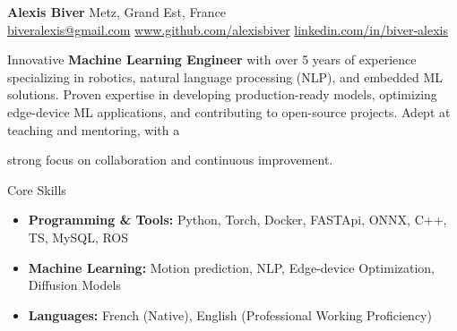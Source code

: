 \documentclass{resume} %
\begin{document}
\begin{center}
    {\Huge \textbf{Alexis Biver}} \hspace{5cm} Metz, Grand Est, France \\
    \href{mailto:biveralexis@gmail.com}{biveralexis@gmail.com}   \hspace{1cm}     \href{https://github.com/alexisbiver}{www.github.com/alexisbiver}  \hspace{1cm} \href{https://linkedin.com/in/biver-alexis}{linkedin.com/in/biver-alexis}
\end{center}

\vspace{0.3cm}

Innovative \textbf{Machine Learning Engineer} with over 5 years of experience specializing in robotics, natural language processing (NLP), and embedded ML solutions. Proven expertise in developing production-ready models, optimizing edge-device ML applications, and contributing to open-source projects. Adept at teaching and mentoring, with a 
\centerline {strong focus on collaboration and continuous improvement.}

 \begin{rSection}{Core Skills}
\begin{itemize}
    \item \textbf{Programming \& Tools:} Python, Torch, Docker, FASTApi, ONNX, C++, TS, MySQL, ROS
    \item \textbf{Machine Learning:} Motion prediction, NLP, Edge-device Optimization, Diffusion Models
    \item \textbf{Languages:} French (Native), English (Professional Working Proficiency)
\end{itemize}
\end{rSection}
\end{document}
